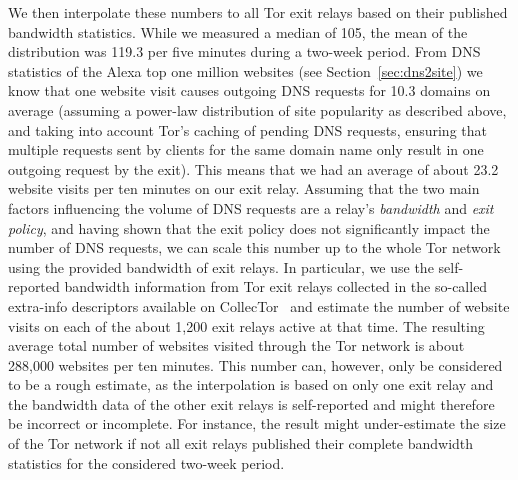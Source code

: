 We then interpolate these numbers to all Tor exit relays based on their
published bandwidth statistics.  While we measured a median of 105,
the mean of the distribution was 119.3 per five minutes during a two-week period.
From DNS statistics of the Alexa top one million websites (see
Section~\ref{sec:dns2site}) we know that one website visit causes outgoing DNS requests for 10.3 domains on average
(assuming a power-law distribution of site popularity as described above, and
taking into account Tor's caching of pending DNS requests, ensuring that multiple
requests sent by clients for the same domain name only result in one outgoing request
by the exit).
This means that we had an average of about 23.2 website visits per ten
minutes on our exit relay.  Assuming that the two main factors influencing the
volume of DNS requests are a relay's \emph{bandwidth} and \emph{exit policy},
and having shown that the exit policy does not significantly impact
the number of DNS requests, we can scale this number up to the whole Tor network
using the provided bandwidth of exit relays.  In particular, we use the
self-reported bandwidth information from Tor exit
relays collected in the so-called extra-info descriptors available on
CollecTor~\cite{collector} and estimate the number of website visits on
each of the about 1,200 exit relays active at that time. The resulting average
total number of websites visited through the Tor network is about 288,000
websites per ten minutes. This number can, however, only be considered
to be a rough estimate, as the interpolation is based on only one exit
relay and the bandwidth data of the other exit relays is self-reported
and might therefore be incorrect or incomplete. For instance, the result
might under-estimate the size of the Tor network if not all exit relays
published their complete bandwidth statistics for the considered
two-week period.


